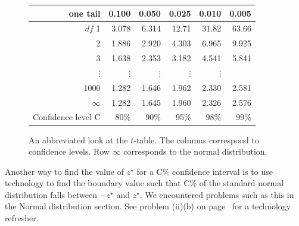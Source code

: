 \begin{figure}[hht]
\centering
\begin{tabular}{r | rrr rr}
one tail & \hspace{1.5mm}  0.100 & \hspace{1.5mm} 0.050 & \hspace{1.5mm} 0.025 & \hspace{1.5mm} 0.010 & \hspace{1.5mm} 0.005  \\
\hline
{$df$} \hfill 1  &  {\normalsize  3.078} & {\normalsize  6.314} & {\normalsize 12.71} & {\normalsize 31.82} & {\normalsize 63.66}  \\ 
2  &  {\normalsize  1.886} & {\normalsize  2.920} & {\normalsize  4.303} & {\normalsize  6.965} & {\normalsize  9.925}  \\ 
3  &  {\normalsize  1.638} & {\normalsize  2.353} & {\normalsize  3.182} & {\normalsize  4.541} & {\normalsize  5.841}  \\ 
$\vdots$ & $\vdots$ &$\vdots$ &$\vdots$ &$\vdots$ & \\
1000  &  {\normalsize  1.282} & {\normalsize  1.646} & {\normalsize  1.962} & {\normalsize  2.330} & {\normalsize  2.581}  \\ 
$\infty$   &  {\normalsize  1.282} & {\normalsize  1.645} & {\normalsize  1.960} & {\normalsize  2.326} & {\normalsize  2.576}   \\
\hline
Confidence level C  &  {\normalsize  80\%} & {\normalsize 90\%} & {\normalsize 95\%} & {\normalsize  98\%} & {\normalsize  99\%}  \\
\hline
\end{tabular}
\caption{An abbreviated look at the $t$-table. The columns correspond to confidence levels. Row $\infty$ corresponds to the normal distribution.}
\label{tTableSample}
\end{figure}

Another way to find the value of $z^{\star}$ for a C\% confidence interval is to use technology to find the boundary value such that C\% of the standard normal distribution falls between $-z^{\star}$ and $z^{\star}$.  We encountered problems such as this in the Normal distribution section.  See problem (ii)(b) on page~\pageref{zstarcalc} for a technology refresher.


